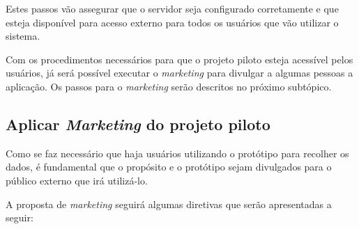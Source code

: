 Estes passos vão assegurar que o servidor seja configurado corretamente e que esteja disponível para acesso externo para
todos os usuários que vão utilizar o sistema.

Com os procedimentos necessários para que o projeto piloto esteja acessível pelos usuários, já será possível executar o \textit{marketing}
para divulgar a algumas pessoas a aplicação. Os passos para o \textit{marketing} serão descritos no próximo subtópico.

\subsection{Aplicar \textit{Marketing} do projeto piloto}
\label{sub:definir_tecnologia}
Como se faz necessário que haja usuários utilizando o protótipo para recolher os dados, é fundamental que o propósito
e o protótipo sejam divulgados para o público externo que irá utilizá-lo. 

A proposta de \textit{marketing} seguirá algumas diretivas que serão apresentadas a seguir:

